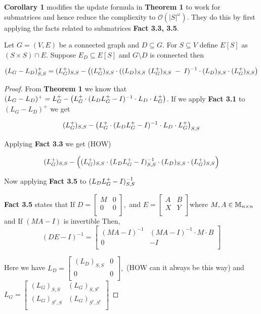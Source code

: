 \textbf{Corollary 1} modifies the update formula in \textbf{Theorem 1} to work for submatrices and hence reduce the compliexity to $\mathcal{O}(|S|^{\omega})$. They do this by first applying the facts related to submatrices \textbf{Fact 3.3, 3.5}. 
\begin{HXc}
  Let $G=(V,E)$ be a connected graph and $D \subseteq G$. For $S \subseteq V$ define $ E[S] $ as $(S \times S) \cap E$. Suppose $E_D \subseteq E[S]$ and  $G \setminus D$ is connected then 
  
  $$ (L_G - L_D)_{S,S}^+ = (L_{G}^{+})_{S,S} - \left( (L_{G}^{+})_{S,S} \cdot ((L_D)_{S,S} \  (L_{G}^{+})_{S,S} \; - \; I)^{-1} \cdot (L_D)_{S,S} \cdot (L_{G}^{+})_{S,S} \right) $$ 
  
\end{HXc}
\begin{proof}
From \textbf{Theorem 1} we know that $(L_G - L_D)^+ = L_{G}^{+} - \left( L_{G}^{+} \cdot (L_DL_{G}^{+}-I)^{-1} \cdot L_D \cdot L_{G}^{+}\right)$. If we apply \textbf{Fact 3.1} to $(L_G - L_D)^+$ we get 

$$ (L_{G}^{+})_{S,S} - \left( L_{G}^{+} \cdot (L_DL_{G}^{+}-I)^{-1} \cdot L_D \cdot L_{G}^{+} \right)_{S,S} $$

Applying \textbf{Fact 3.3} we get (HOW)

$$(L_{G}^{+})_{S,S} - \left( (L_{G}^{+})_{S,S} \cdot (L_DL_{G}^{+}-I)^{-1}_{S,S} \cdot (L_D)_{S,S} \cdot (L_{G}^{+})_{S,S} \right) $$

Now applying \textbf{Fact 3.5} to $(L_DL_{G}^{+}-I)^{-1}_{S,S}$ 

\textbf{Fact 3.5} states that If 
$D = 
\begin{bmatrix}
M & 0 \\
0 & 0 \\
\end{bmatrix},
$ 
and $
E = 
\begin{bmatrix}
A & B \\
X & Y \\
\end{bmatrix}
$where $M, A \in \mathbb{M}_{n \times n}$ and If $(MA - I)$ is invertible Then,
$$ (DE - I)^{-1} = \begin{bmatrix}
(MA - I)^{-1} & (MA - I)^{-1} \cdot M \cdot B \\
0 & -I \\
\end{bmatrix}
$$

Here we have $L_D = 
\begin{bmatrix}
(L_D)_{S,S} & 0 \\
0 & 0 \\
\end{bmatrix},
$ (HOW can it always be this way)
and $
L_G = 
\begin{bmatrix}
(L_G)_{S,S} & (L_G)_{S,S^c} \\
(L_G)_{S^c,S} & (L_G)_{S^c,S^c} \\
\end{bmatrix}
$


\end{proof}

